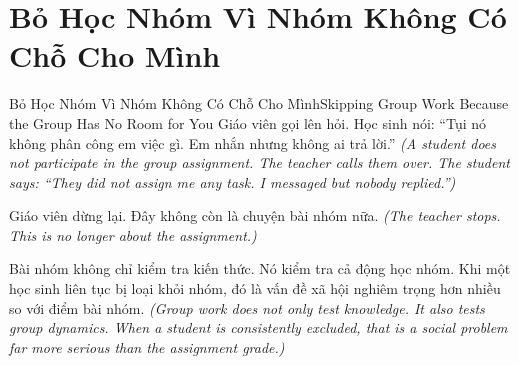 \section{Bỏ Học Nhóm Vì Nhóm Không Có Chỗ Cho Mình}
\begin{truyen}{Bỏ Học Nhóm Vì Nhóm Không Có Chỗ Cho Mình}{Skipping Group Work Because the Group Has No Room for You}
 Giáo viên gọi lên hỏi. Học sinh nói: ``Tụi nó không phân công em việc gì. Em nhắn nhưng không ai trả lời.''
\textit{(A student does not participate in the group assignment. The teacher calls them over. The student says: ``They did not assign me any task. I messaged but nobody replied.'')}



Giáo viên dừng lại. Đây không còn là chuyện bài nhóm nữa.
\textit{(The teacher stops. This is no longer about the assignment.)}

\begin{baihoc}
Bài nhóm không chỉ kiểm tra kiến thức. Nó kiểm tra cả động học nhóm. Khi một học sinh liên tục bị loại khỏi nhóm, đó là vấn đề xã hội nghiêm trọng hơn nhiều so với điểm bài nhóm.
\textit{(Group work does not only test knowledge. It also tests group dynamics. When a student is consistently excluded, that is a social problem far more serious than the assignment grade.)}
\end{baihoc}
\end{truyen}

